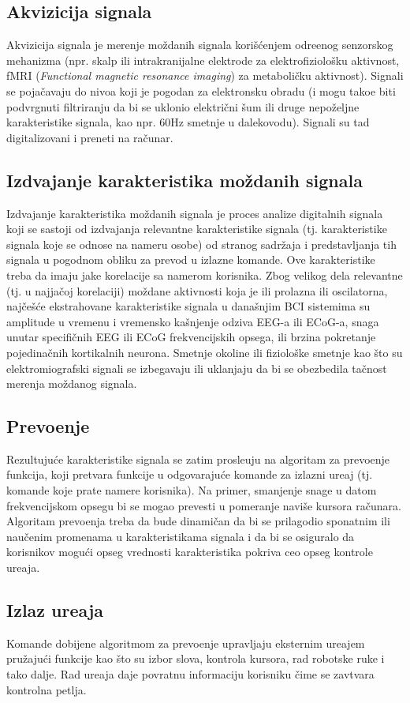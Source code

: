 \documentclass[conference]{IEEEtran}
\begin{document}
\subsection{Akvizicija signala}
Akvizicija signala je merenje moždanih signala korišćenjem odre\dj enog senzorskog mehanizma (npr. skalp ili intrakranijalne elektrode za elektrofiziološku aktivnost, fMRI (\textit{Functional magnetic resonance imaging}) za metaboličku aktivnost). Signali se pojačavaju do nivoa koji je pogodan za elektronsku obradu (i mogu tako\dj e biti podvrgnuti filtriranju da bi se uklonio električni šum ili druge nepoželjne karakteristike signala, kao npr. 60Hz smetnje u dalekovodu). Signali su tad digitalizovani i preneti na računar. 
\subsection{Izdvajanje karakteristika moždanih signala}
Izdvajanje karakteristika moždanih signala je proces analize digitalnih signala koji se sastoji od izdvajanja relevantne karakteristike signala (tj. karakteristike signala koje se odnose na nameru osobe) od stranog sadržaja i predstavljanja tih signala u pogodnom obliku za prevod u izlazne komande. Ove karakteristike treba da imaju jake korelacije sa namerom korisnika. Zbog velikog dela relevantne (tj. u najjačoj korelaciji) moždane aktivnosti koja je ili prolazna ili oscilatorna, najčešće ekstrahovane karakteristike signala u današnjim BCI sistemima su amplitude u vremenu i vremensko kašnjenje odziva EEG-a ili ECoG-a, snaga unutar specifičnih EEG ili ECoG frekvencijskih opsega, ili brzina pokretanje pojedinačnih kortikalnih neurona. Smetnje okoline ili fiziološke smetnje kao što su elektromiografski signali se izbegavaju ili uklanjaju da bi se obezbedila tačnost merenja moždanog signala.
\subsection{Prevo\dj enje}
Rezultujuće karakteristike signala se zatim prosle\dj uju na algoritam za prevo\dj enje funkcija, koji pretvara funkcije u odgovarajuće komande za izlazni ure\dj aj (tj. komande koje prate namere korisnika). Na primer, smanjenje snage u datom frekvencijskom opsegu bi se mogao prevesti u pomeranje naviše kursora računara. Algoritam prevo\dj enja treba da bude dinamičan da bi se prilagodio sponatnim ili naučenim promenama u karakteristikama signala i da bi se osiguralo da korisnikov mogući opseg vrednosti karakteristika pokriva ceo opseg kontrole ure\dj aja.
\subsection{Izlaz ure\dj aja}
Komande dobijene algoritmom za prevo\dj enje upravljaju eksternim ure\dj ajem pružajući funkcije kao što su izbor slova, kontrola kursora, rad robotske ruke i tako dalje. Rad ure\dj aja daje povratnu informaciju korisniku čime se zavtvara kontrolna petlja. 
\end{document}
